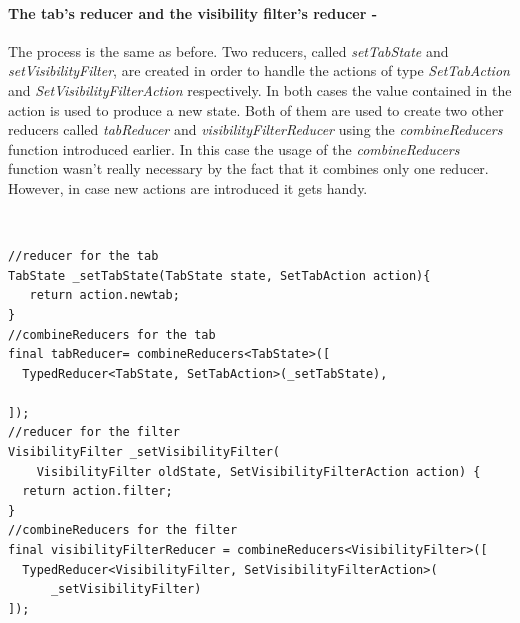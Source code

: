 \paragraph{The tab's reducer and the visibility filter's reducer - }
\label{subpar:todo_app_bloc_core_state}
The process is the same as before. Two reducers, called \textit{setTabState} and \textit{setVisibilityFilter}, are created in order to handle the actions of type \textit{SetTabAction} and \textit{SetVisibilityFilterAction} respectively. In both cases the value contained in the action is used to produce a new state. Both of them are used to create  two other reducers called \textit{tabReducer} and \textit{visibilityFilterReducer} using the \textit{combineReducers} function introduced earlier. In this case the usage of the \textit{combineReducers} function wasn’t really necessary by the fact that it combines only one reducer. However, in case new actions are introduced it gets handy.
\begin{code}
\mbox{}\\
 \mbox{}
		\label{code:2.14}
\begin{verbatim}
//reducer for the tab
TabState _setTabState(TabState state, SetTabAction action){
   return action.newtab;
}
//combineReducers for the tab
final tabReducer= combineReducers<TabState>([
  TypedReducer<TabState, SetTabAction>(_setTabState),

]);
//reducer for the filter
VisibilityFilter _setVisibilityFilter(
    VisibilityFilter oldState, SetVisibilityFilterAction action) {
  return action.filter;
}
//combineReducers for the filter
final visibilityFilterReducer = combineReducers<VisibilityFilter>([
  TypedReducer<VisibilityFilter, SetVisibilityFilterAction>(
      _setVisibilityFilter)
]);
\end{verbatim}
\mbox{}
\end{code}

